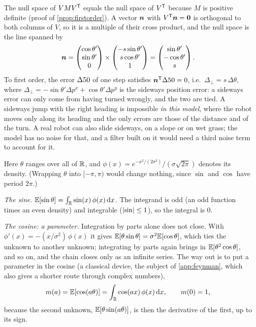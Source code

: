  The null space of $VMV^{\mathsf{T}}$ equals the null space of $V^{\mathsf{T}}$
because $M$ is positive definite (proof of \cref{prop:firstorder}). A
vector $\bm{n}$ with $V^{\mathsf{T}}\bm{n}=
\bm{0}$ is orthogonal to both columns of $V$, so it is a multiple of
their cross product, and the null space is the line spanned by
\[
  \bm{n}=\begin{pmatrix}\cos\theta'\\\sin\theta'\\0\end{pmatrix}\times
  \begin{pmatrix}-s\sin\theta'\\s\cos\theta'\\1\end{pmatrix}
  =\begin{pmatrix}\sin\theta'\\-\cos\theta'\\s\end{pmatrix}.
\]
To first order, the error $\Delta50$ of one step satisfies
$\bm{n}^{\mathsf{T}}\Delta50=0$, i.e.\ $\Delta_{\perp}=s\,\Delta\theta$, where
$\Delta_\perp=-\sin\theta'\Delta p^x+\cos\theta'\Delta p^y$ is the
sideways position error: a sideways error can only come from having turned
wrongly, and the two are tied. A sideways jump with the right heading is
impossible \emph{in this model}, where the robot moves only along its
heading and the only errors are those of the distance and of the turn. A
real robot can also slide sideways, on a slope or on wet grass; the model
has no noise for that, and a filter built on it would need a third noise
term to account for it.

 Here $\theta$ ranges over all of $\mathbb{R}$, and
$\phi(x)=e^{-x^2/(2\sigma^2)}/(\sigma\sqrt{2\pi})$ denotes its density.
(Wrapping $\theta$ into $[-\pi,\pi)$ would change nothing, since $\sin$
and $\cos$ have period $2\pi$.)

\emph{The sine.} $\mathbb{E}[\sin\theta]=\int_{\mathbb{R}}\sin(x)\,\phi(x)\,\mathrm dx$.
The integrand is odd (an odd function times an even density) and
integrable ($\left\lvert \sin\right\rvert\le1$), so the integral is $0$.

\emph{The cosine: a parameter.} Integration by parts alone does not
close. With $\phi'(x)=-(x/\sigma^2)\,\phi(x)$ it gives
$\mathbb{E}[\theta\sin\theta]=\sigma^2\mathbb{E}[\cos\theta]$, which ties the unknown to
another unknown; integrating by parts again brings in
$\mathbb{E}[\theta^2\cos\theta]$, and so on, and the chain closes only as an
infinite series. The way out is to put a parameter in the cosine (a
classical device, the subject of \cref{app:feynman}, which also gives a
shorter route through complex numbers),
\[
  m(a)=\mathbb{E}[\cos(a\theta)]=\int_{\mathbb{R}}\cos(ax)\,\phi(x)\,\mathrm dx ,
  \qquad m(0)=1 ,
\]
because the second unknown, $\mathbb{E}[\theta\sin(a\theta)]$, is then the
derivative of the first, up to its sign.

